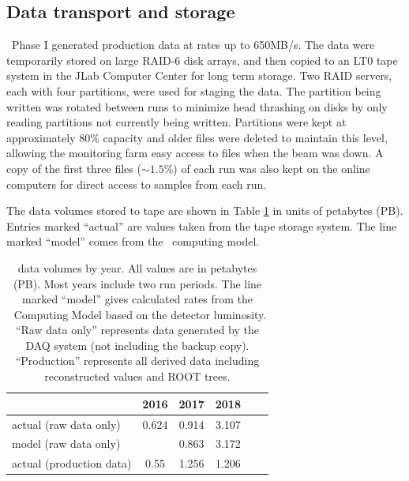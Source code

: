 \subsection{Data transport and storage \label{sec:onlineprocessing}}

\GX ~Phase I generated production data at rates up to 650MB/s. The data were temporarily stored on large RAID-6 disk arrays, and then copied to an LT0 tape system in the JLab Computer Center for long term storage. Two RAID servers, each with four partitions, were used for staging the data. The partition being written was rotated between runs  to minimize head thrashing on disks by only reading partitions not currently being written. Partitions were kept at approximately 80\% capacity and older files were deleted to maintain this level,  allowing the monitoring farm easy access to files when the beam was down. A copy of the first three files ($\sim1.5\%$) of each run was also kept on the online computers for direct access to samples from each run.      

The data volumes stored to tape are shown in Table \ref{tab:online_data_volumes} in units of petabytes (PB). Entries marked ``actual'' are values taken from the tape storage system. The line marked ``model'' comes from the \GX ~computing model\cite{gx3821}.

\begin{table}[tb]
    \centering
    \begin{tabular}{|l|c|c|c|c|c|}
    \hline
                           & \textbf{2016}  & \textbf{2017}  & \textbf{2018} \\
    \hline
    actual (raw data only) & 0.624 & 0.914 & 3.107 \\
    \hline
     model (raw data only) &       & 0.863 & 3.172 \\
    \hline
    \hline
    actual (production data)    & 0.55  & 1.256 & 1.206 \\
    \hline
    \end{tabular}
    \caption{\GX{} data volumes by year. All values are in petabytes (PB). Most years include two run periods. The line marked ``model'' gives calculated rates from the \GX ~Computing Model\cite{gx3821} based on the detector luminosity. ``Raw data only'' represents data generated by the DAQ system (not including the backup copy). ``Production'' represents all derived data including reconstructed values and ROOT trees. }
    \label{tab:online_data_volumes}
\end{table}

